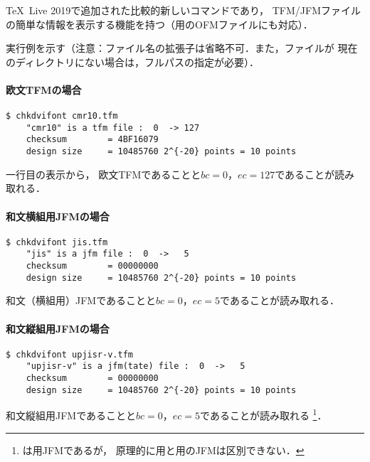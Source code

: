 \documentclass[a4paper,11pt,nomag]{jsarticle}
\def\size#1{\mathit{#1}}
\begin{document}
\TeX~Live 2019で追加された比較的新しいコマンドであり，
TFM/JFMファイルの簡単な情報を表示する機能を持つ（\OMEGA 用のOFMファイルにも対応）．

実行例を示す（注意：ファイル名の拡張子は省略不可．また，ファイルが
現在のディレクトリにない場合は，フルパスの指定が必要）．

\paragraph{欧文TFMの場合}
\begin{verbatim}
$ chkdvifont cmr10.tfm
    "cmr10" is a tfm file :  0  -> 127
    checksum        = 4BF16079
    design size     = 10485760 2^{-20} points = 10 points
\end{verbatim}
一行目の表示から，
欧文TFMであることと$\size{bc}=0$，$\size{ec}=127$であることが読み取れる．

\paragraph{和文横組用JFMの場合}
\begin{verbatim}
$ chkdvifont jis.tfm
    "jis" is a jfm file :  0  ->   5
    checksum        = 00000000
    design size     = 10485760 2^{-20} points = 10 points
\end{verbatim}
和文（横組用）JFMであることと$\size{bc}=0$，$\size{ec}=5$であることが読み取れる．

\paragraph{和文縦組用JFMの場合}
\begin{verbatim}
$ chkdvifont upjisr-v.tfm
    "upjisr-v" is a jfm(tate) file :  0  ->   5
    checksum        = 00000000
    design size     = 10485760 2^{-20} points = 10 points
\end{verbatim}
和文縦組用JFMであることと$\size{bc}=0$，$\size{ec}=5$であることが読み取れる
\footnote{は\upTeX 用JFMであるが，
原理的に\pTeX 用と\upTeX 用のJFMは区別できない．}．
\end{document}
